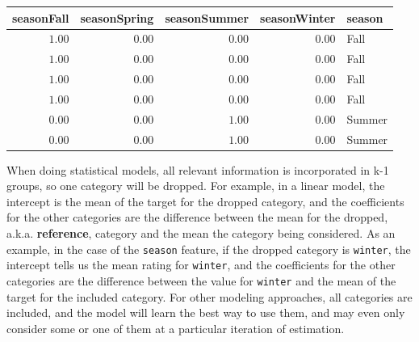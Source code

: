 \documentclass[
  letterpaper,
]{krantz}
\begin{document}
\begin{longtable*}{rrrrl}
\toprule
seasonFall & seasonSpring & seasonSummer & seasonWinter & season \\ 
\midrule\addlinespace[2.5pt]
\textcolor[HTML]{404040}{$1.00$} & \textcolor[HTML]{404040}{$0.00$} & \textcolor[HTML]{404040}{$0.00$} & \textcolor[HTML]{404040}{$0.00$} & Fall \\ 
\textcolor[HTML]{404040}{$1.00$} & \textcolor[HTML]{404040}{$0.00$} & \textcolor[HTML]{404040}{$0.00$} & \textcolor[HTML]{404040}{$0.00$} & Fall \\ 
\textcolor[HTML]{404040}{$1.00$} & \textcolor[HTML]{404040}{$0.00$} & \textcolor[HTML]{404040}{$0.00$} & \textcolor[HTML]{404040}{$0.00$} & Fall \\ 
\textcolor[HTML]{404040}{$1.00$} & \textcolor[HTML]{404040}{$0.00$} & \textcolor[HTML]{404040}{$0.00$} & \textcolor[HTML]{404040}{$0.00$} & Fall \\ 
\textcolor[HTML]{404040}{$0.00$} & \textcolor[HTML]{404040}{$0.00$} & \textcolor[HTML]{404040}{$1.00$} & \textcolor[HTML]{404040}{$0.00$} & Summer \\ 
\textcolor[HTML]{404040}{$0.00$} & \textcolor[HTML]{404040}{$0.00$} & \textcolor[HTML]{404040}{$1.00$} & \textcolor[HTML]{404040}{$0.00$} & Summer \\ 
\bottomrule
\end{longtable*}

\begin{tcolorbox}[enhanced jigsaw, titlerule=0mm, colbacktitle=quarto-callout-note-color!10!white, title=\textcolor{quarto-callout-note-color}{\faInfo}\hspace{0.5em}{Note}, bottomtitle=1mm, rightrule=.15mm, colframe=quarto-callout-note-color-frame, colback=white, opacityback=0, left=2mm, arc=.35mm, toptitle=1mm, bottomrule=.15mm, leftrule=.75mm, toprule=.15mm, coltitle=black, breakable, opacitybacktitle=0.6]

When doing statistical models, all relevant information is incorporated
in k-1 groups, so one category will be dropped. For example, in a linear
model, the intercept is the mean of the target for the dropped category,
and the coefficients for the other categories are the difference between
the mean for the dropped, a.k.a. \textbf{reference}, category and the
mean the category being considered. As an example, in the case of the
\texttt{season} feature, if the dropped category is \texttt{winter}, the
intercept tells us the mean rating for \texttt{winter}, and the
coefficients for the other categories are the difference between the
value for \texttt{winter} and the mean of the target for the included
category. For other modeling approaches, all categories are included,
and the model will learn the best way to use them, and may even only
consider some or one of them at a particular iteration of estimation.

\end{tcolorbox}
\end{document}
